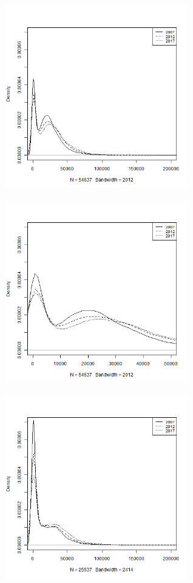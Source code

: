 \documentclass[12pt,]{article}
\let\origfigure\figure
\let\endorigfigure\endfigure
\renewenvironment{figure}[1][2] {
        \expandafter\origfigure\expandafter[H]
      } {\endorigfigure}
\begin{document}
\begin{figure}
\centering
\includegraphics[width=0.60000\textwidth]{img/densityp11.png}
\caption{Pre-tax factor income - Equal sharing}
\end{figure}

\begin{figure}
\centering
\includegraphics[width=0.60000\textwidth]{img/densityp11closer.png}
\caption{A closer look: Pre-tax factor income - Equal sharing}
\end{figure}

\begin{figure}
\centering
\includegraphics[width=0.60000\textwidth]{img/densityp21.png}
\caption{Pre-tax factor income - Partial sharing}
\end{figure}
\end{document}
